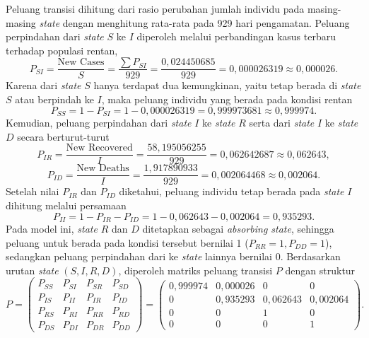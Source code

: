 \documentclass[12pt,a4paper]{article}
\numberwithin{equation}{section}
\begin{document}
Peluang transisi dihitung dari rasio perubahan jumlah individu pada masing-masing \textit{state} dengan menghitung rata-rata pada 929 hari pengamatan. Peluang perpindahan dari \textit{state} $S$ ke $I$ diperoleh melalui perbandingan kasus terbaru terhadap populasi rentan,
\begin{equation*}
  P_{SI} = \frac{\text{New Cases}}{S} = \frac{\sum P_{SI}}{929} = \frac{0{,}024450685}{929} = 0{,}000026319 \approx 0{,}000026.
\end{equation*}
Karena dari \textit{state} $S$ hanya terdapat dua kemungkinan, yaitu tetap berada di \textit{state} $S$ atau berpindah ke $I$, maka peluang individu yang berada pada kondisi rentan
\begin{equation*}
  P_{SS} = 1 - P_{SI} = 1 - 0{,}000026319 = 0{,}999973681 \approx 0{,}999974.
\end{equation*}
Kemudian, peluang perpindahan dari \textit{state} $I$ ke \textit{state} $R$ serta dari \textit{state} $I$ ke \textit{state} $D$ secara berturut-turut
\begin{equation*}
  P_{IR} = \frac{\text{New Recovered}}{I} = \frac{58{,}195056255}{929} = 0{,}062642687 \approx 0{,}062643,
\end{equation*}
\begin{equation*}
  P_{ID} = \frac{\text{New Deaths}}{I} = \frac{1{,}917890933}{929} = 0{,}002064468 \approx 0{,}002064.
\end{equation*}
Setelah nilai $P_{IR}$ dan $P_{ID}$ diketahui, peluang individu tetap berada pada \textit{state} $I$ dihitung melalui persamaan
\begin{equation*}
  P_{II} = 1 - P_{IR} - P_{ID} = 1 - 0{,}062643 - 0{,}002064 = 0{,}935293.
\end{equation*}
Pada model ini, \textit{state} $R$ dan $D$ ditetapkan sebagai \textit{absorbing state}, sehingga peluang untuk berada pada kondisi tersebut bernilai 1 ($P_{RR} = 1, P_{DD} = 1$), sedangkan peluang perpindahan dari ke \textit{state} lainnya bernilai 0. Berdasarkan urutan \textit{state} $(S, I, R, D)$, diperoleh matriks peluang transisi $P$ dengan struktur
\begin{equation}
  P = 
  \begin{pmatrix}
    P_{SS} & P_{SI} & P_{SR} & P_{SD} \\
    P_{IS} & P_{II} & P_{IR} & P_{ID} \\
    P_{RS} & P_{RI} & P_{RR} & P_{RD} \\
    P_{DS} & P_{DI} & P_{DR} & P_{DD}
  \end{pmatrix}
  =
  \begin{pmatrix}
    0{,}999974 & 0{,}000026 & 0 & 0 \\
    0          & 0{,}935293 & 0{,}062643 & 0{,}002064 \\
    0          & 0          & 1 & 0 \\
    0          & 0          & 0 & 1
  \end{pmatrix}.
  \label{eq:matrix_P}
\end{equation}
\end{document}
